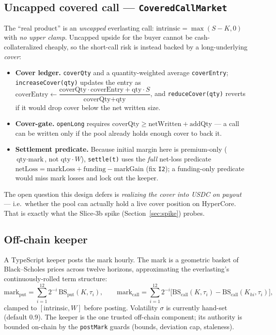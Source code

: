 \documentclass[11pt]{article}
\newcommand{\code}[1]{\texttt{\small #1}}
\begin{document}
\subsection{Uncapped covered call --- \code{CoveredCallMarket}}\label{sec:covered}
The ``real product'' is an \emph{uncapped} everlasting call: $\text{intrinsic} = \max(S-K,0)$ with
\emph{no upper clamp}. Uncapped upside for the buyer cannot be cash-collateralized cheaply, so the
short-call risk is instead backed by a long-underlying \emph{cover}:
\begin{itemize}[leftmargin=1.4em,itemsep=3pt]
  \item \textbf{Cover ledger.} \code{coverQty} and a quantity-weighted average \code{coverEntry};
        \code{increaseCover(qty)} updates the entry as
        $\text{coverEntry} \leftarrow \dfrac{\text{coverQty}\cdot\text{coverEntry} + \text{qty}\cdot S}
        {\text{coverQty}+\text{qty}}$, and \code{reduceCover(qty)} reverts if it would drop cover
        below the net written size.
  \item \textbf{Cover-gate.} \code{openLong} requires
        $\text{coverQty} \geq \text{netWritten} + \text{addQty}$ --- a call can be written only if the
        pool already holds enough cover to back it.
  \item \textbf{Settlement predicate.} Because initial margin here is premium-only
        ($\text{qty}\cdot\text{mark}$, not $\text{qty}\cdot W$), \code{settle(t)} uses the \emph{full}
        net-loss predicate $\text{netLoss} = \text{markLoss} + \text{funding} - \text{markGain}$
        (fix \code{I2}); a funding-only predicate would miss mark losses and lock out the keeper.
\end{itemize}
The open question this design defers is \emph{realizing the cover into USDC on payout} --- i.e.\
whether the pool can actually hold a live cover position on HyperCore. That is exactly what the
Slice-3b spike (Section~\ref{sec:spike}) probes.

\subsection{Off-chain keeper}
A TypeScript keeper posts the mark hourly. The mark is a geometric basket of Black--Scholes prices
across twelve horizons, approximating the everlasting's continuously-rolled term structure:
\[
\text{mark}_{\text{put}} = \sum_{i=1}^{12} 2^{-i}\,\text{BS}_{\text{put}}(K,\tau_i),
\qquad
\text{mark}_{\text{call}} = \sum_{i=1}^{12} 2^{-i}\big[\text{BS}_{\text{call}}(K,\tau_i)-\text{BS}_{\text{call}}(K_{hi},\tau_i)\big],
\]
clamped to $[\text{intrinsic}, W]$ before posting. Volatility $\sigma$ is currently hand-set
(default 0.9). The keeper is the one trusted off-chain component; its authority is bounded on-chain by
the \code{postMark} guards (bounds, deviation cap, staleness).
\end{document}
